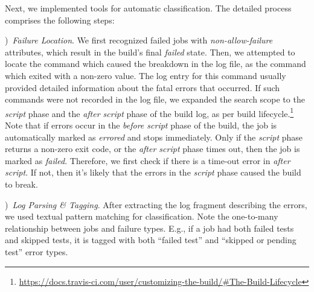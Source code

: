 Next, we implemented tools for automatic classification. 
The detailed process comprises the following steps:

)~\emph{Failure Location}. 
We first recognized failed jobs with \textit{non-allow-failure} attributes, which 
result in the build's final \textit{failed} state. 
Then, we attempted to locate the command which caused the breakdown 
in the log file, as the command which exited with a non-zero value.
The log entry for this command usually provided detailed information about 
the fatal errors that occurred. 
If such commands were not recorded in the log file, we expanded the search 
scope to the \textit{script} phase and the \textit{after script} phase of the 
build log, as per \Tvis build lifecycle.\footnote{\url{https://docs.travis-ci.com/user/customizing-the-build/#The-Build-Lifecycle}}
Note that if errors occur in the \emph{before script} phase of the build, the 
job is automatically marked as \textit{errored} and stops immediately. 
Only if the \textit{script} phase returns a non-zero exit code, or the \textit{after 
script} phase times out, then the job is marked as \textit{failed}. 
Therefore, we first check if there is a time-out error in \textit{after script}. 
If not, then it's likely that the errors in the \textit{script} phase caused the 
build to break. 

)~\emph{Log Parsing \& Tagging}. 
After extracting the log fragment describing the errors, we 
used textual pattern matching for classification. 
%
Note the one-to-many relationship between jobs and failure types. 
E.g., if a job had both failed tests and skipped tests, it is tagged 
with both ``failed test'' and ``skipped or pending test'' error types.


